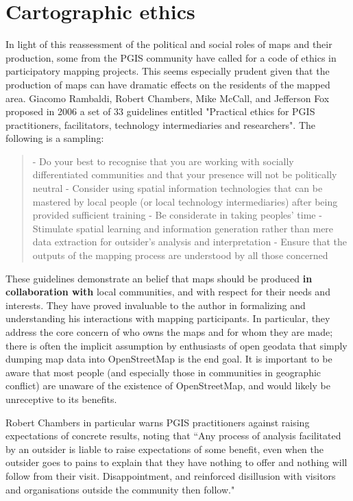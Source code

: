 \documentclass[11pt]{report}
\begin{document}
\section{Cartographic ethics}

In light of this reassessment of the political and social roles of maps and their production, some from the PGIS community have called for a code of ethics in participatory mapping projects. This seems especially prudent given that the production of maps can have dramatic effects on the residents of the mapped area. Giacomo Rambaldi, Robert Chambers, Mike McCall, and Jefferson Fox proposed in 2006 a set of 33 guidelines entitled "Practical ethics for PGIS practitioners, facilitators, technology intermediaries and researchers". The following is a sampling:

\begin{quote}
- Do your best to recognise that you are working with socially differentiated communities and that your presence will not be politically neutral
- Consider using spatial information technologies that can be mastered by local people (or local technology intermediaries) after being provided sufficient training
- Be considerate in taking peoples' time
- Stimulate spatial learning and information generation rather than mere data extraction for outsider’s analysis and interpretation
- Ensure that the outputs of the mapping process are understood by all those concerned
\cite{rambaldi2006practical}
\end{quote}

These guidelines demonstrate an belief that maps should be produced \textbf{in collaboration with} local communities, and with respect for their needs and interests. They have proved invaluable to the author in formalizing and understanding his interactions with mapping participants. In particular, they address the core concern of who owns the maps and for whom they are made; there is often the implicit assumption by enthusiasts of open geodata that simply dumping map data into OpenStreetMap is the end goal. It is important to be aware that most people (and especially those in communities in geographic conflict) are unaware of the existence of OpenStreetMap, and would likely be unreceptive to its benefits. 

Robert Chambers in particular warns PGIS practitioners against raising expectations of concrete results, noting that ``Any process of analysis facilitated by an outsider is liable to raise expectations of some benefit, even when the outsider goes to pains to explain that they have nothing to offer and nothing will follow from their visit. Disappointment, and reinforced disillusion with visitors and organisations outside the community then follow."
\end{document}
